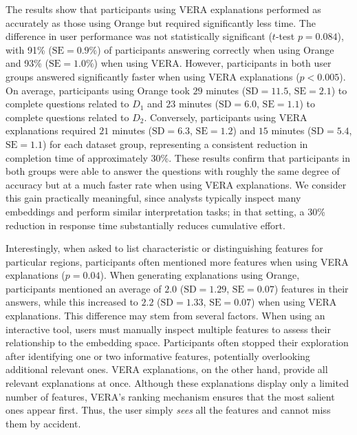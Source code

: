 \documentclass[lettersize,journal]{IEEEtran}
\begin{document}
The results show that participants using VERA explanations performed as accurately as those using Orange but required significantly less time.
The difference in user performance was not statistically significant ($t$-test $p=0.084$), with 91\% ($\text{SE}=0.9\%$) of participants answering correctly when using Orange and 93\% ($\text{SE}=1.0\%$) when using VERA.
However, participants in both user groups answered significantly faster when using VERA explanations ($p<0.005$). On average, participants using Orange took $29$ minutes ($\text{SD}= 11.5$, $\text{SE}=2.1$) to complete questions related to $D_1$ and $23$ minutes ($\text{SD}= 6.0$, $\text{SE}=1.1$) to complete questions related to $D_2$. Conversely, participants using VERA explanations required $21$ minutes ($\text{SD}= 6.3$, $\text{SE}=1.2$) and $15$ minutes ($\text{SD}=5.4$, $\text{SE}=1.1$) for each dataset group, representing a consistent reduction in completion time of approximately 30\%.
These results confirm that participants in both groups were able to answer the questions with roughly the same degree of accuracy but at a much faster rate when using VERA explanations.
We consider this gain practically meaningful, since analysts typically inspect many embeddings and perform similar interpretation tasks; in that setting, a 30\% reduction in response time substantially reduces cumulative effort.

Interestingly, when asked to list characteristic or distinguishing features for particular regions, participants often mentioned more features when using VERA explanations ($p=0.04$). When generating explanations using Orange, participants mentioned an average of $2.0$ ($\text{SD}= 1.29$, $\text{SE}=0.07$) features in their answers, while this increased to $2.2$ ($\text{SD}= 1.33$, $\text{SE}=0.07$) when using VERA explanations. This difference may stem from several factors. When using an interactive tool, users must manually inspect multiple features to assess their relationship to the embedding space. Participants often stopped their exploration after identifying one or two informative features, potentially overlooking additional relevant ones. VERA explanations, on the other hand, provide all relevant explanations at once. Although these explanations display only a limited number of features, VERA's ranking mechanism ensures that the most salient ones appear first. Thus, the user simply \textit{sees} all the features and cannot miss them by accident.
\end{document}

